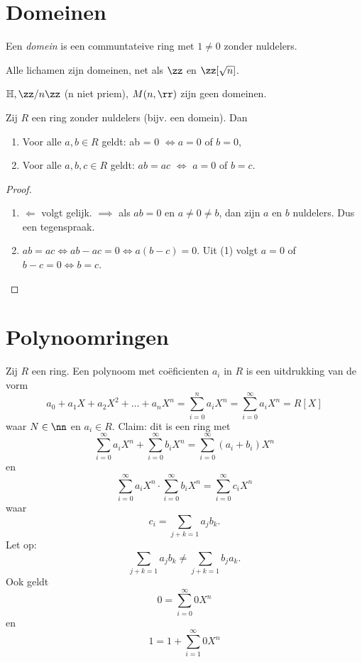 \documentclass[a4paper,12pt,oneside]{book}
\begin{document}
\section{Domeinen}
\begin{definitie}[Domein] 
Een \textit{domein} is een communtateive ring met $1\ne 0$ zonder nuldelers.
\end{definitie}

\begin{remark}
Alle lichamen zijn domeinen, net als $\zz$ en $\zz [\sqrt{n}]$.
\end{remark}

\begin{remark}
$\mathbb{H}, \zz/n\zz$ (n niet priem), $M(n,\rr)$ zijn geen domeinen.
\end{remark}

\begin{theorem}[1.23]
Zij $R$ een ring zonder nuldelers (bijv. een domein). Dan
\begin{enumerate}
\item Voor alle $a, b \in R$ geldt: ab = 0 $\iff a = 0 $ of $b = 0$,
 
\item Voor alle $a, b, c \in R$ geldt: $ab = ac$ $\iff$ $a = 0$ of $b = c$.
\end{enumerate}
\end{theorem}

\begin{proof}
\begin{enumerate}
\item $\Longleftarrow$ volgt gelijk. $\implies$ als $ab =0$ en $a \ne 0 \ne b$, dan zijn $a$ en $b$ nuldelers. Dus een tegenspraak.
\item $ab = ac \iff ab -ac =0 \iff a(b-c) = 0$. Uit (1) volgt $a = 0$ of $b-c =0 \iff b=c$.
\end{enumerate}
\end{proof}

\section{Polynoomringen}
Zij $R$ een ring. Een polynoom met co\"eficienten $a_i$ in $R$ is een uitdrukking van de vorm
\[
a_0 +a_1 X + a_2X^2 + \ldots + a_nX^n = \sum_{i=0}^{n}a_iX^n = \sum_{i=0}^{\infty}a_iX^n = R[X]
\]
waar $N \in \nn$ en $a_i \in R$. Claim: dit is een ring met 
\[
\sum_{i=0}^{\infty}a_iX^n + \sum_{i=0}^{\infty}b_iX^n = \sum_{i=0}^{\infty}(a_i + b_i)X^n
\]
en
\[
\sum_{i=0}^{\infty}a_iX^n \cdot \sum_{i=0}^{\infty}b_iX^n = \sum_{i=0}^{\infty}c_iX^n
\]
waar 
\[
c_i = \sum_{j+k=1}a_jb_k.
\]
Let op:
\[
\sum_{j+k=1}a_jb_k \ne \sum_{j+k=1}b_ja_k.
\]
Ook geldt
\[0= \sum_{i=0}^{\infty}0X^n\]
en 
\[
1 = 1 + \sum_{i=1}^{\infty}0X^n
\]
\end{document}
